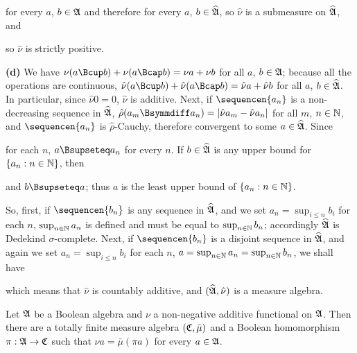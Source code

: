 {

\noindent for every $a$, $b\in\frak A$ and therefore for every
$a$, $b\in\widehat{\frak A}$, so $\hat\nu$ is a submeasure on
$\widehat{\frak A}$, and


\noindent so $\hat\nu$ is strictly positive.

\medskip

{\bf (d)} We have $\nu(a\Bcup b)+\nu(a\Bcap b)=\nu a+\nu b$ for all $a$,
$b\in\frak A$;  because all the operations are continuous,
$\hat\nu(a\Bcup b)+\hat\nu(a\Bcap b)=\hat\nu a+\hat\nu b$ for all $a$,
$b\in\widehat{\frak A}$.   In particular, since $\hat\nu 0=0$,
$\hat\nu$ is additive.
Next, if $\sequencen{a_n}$ is a non-decreasing sequence in
$\widehat{\frak A}$,
$\hat\rho(a_m\Bsymmdiff a_n)=|\hat\nu a_m-\hat\nu a_n|$ for all $m$, $n\in\Bbb N$,
and $\sequencen{a_n}$ is $\hat\rho$-Cauchy, therefore convergent to some
$a\in\widehat{\frak A}$.
Since


\noindent for each $n$,
$a\Bsupseteq a_n$ for every $n$.   If $b\in\widehat{\frak A}$ is any upper
bound for $\{a_n:n\in\Bbb N\}$, then


\noindent and $b\Bsupseteq a$;  thus $a$ is the least upper bound
of $\{a_n:n\in\Bbb N\}$.

So, first, if $\sequencen{b_n}$ is any sequence in $\widehat{\frak A}$, and
we set $a_n=\sup_{i\le n}b_i$ for each $n$, $\sup_{n\in\Bbb N}a_n$ is
defined and must be equal to $\sup_{n\in\Bbb N}b_n$;  accordingly $\widehat{\frak A}$
is Dedekind $\sigma$-complete.   Next, if $\sequencen{b_n}$ is a disjoint
sequence in $\widehat{\frak A}$, and again we set $a_n=\sup_{i\le n}b_i$ for each $n$,
$a=\sup_{n\in\Bbb N}a_n=\sup_{n\in\Bbb N}b_n$, we shall have


\noindent which means that $\hat\nu$ is countably additive, and
$(\widehat{\frak A},\hat\nu)$ is a measure algebra.
}%

 Let $\frak A$ be a Boolean algebra and $\nu$ a
non-negative additive functional on $\frak A$.   Then there are a totally
finite measure algebra $(\frak C,\bar\mu)$ and a Boolean homomorphism
$\pi:\frak A\to\frak C$ such that $\nu a=\bar\mu(\pi a)$ for every
$a\in\frak A$.

